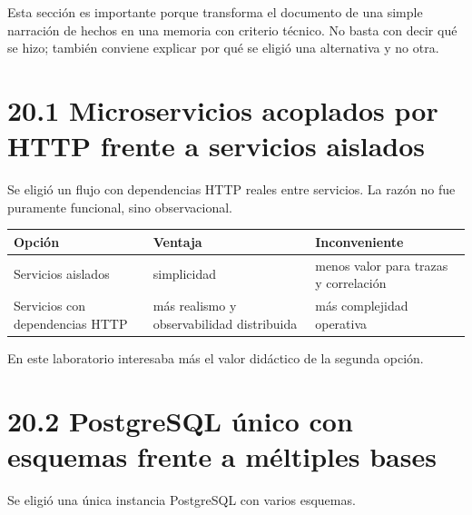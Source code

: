 \documentclass[
a4paper,
12pt]{report}
\begin{document}
Esta sección es importante porque transforma el documento de una simple
narración de hechos en una memoria con criterio técnico. No basta con
decir qué se hizo; también conviene explicar por qué se eligió una
alternativa y no otra.

\section{20.1 Microservicios acoplados por HTTP frente a servicios
aislados}\label{microservicios-acoplados-por-http-frente-a-servicios-aislados}

Se eligió un flujo con dependencias HTTP reales entre servicios. La
razón no fue puramente funcional, sino observacional.

{\def\LTcaptype{table} %
\begin{longtable}[]{@{}
  >{\raggedright\arraybackslash}p{}
  >{\raggedright\arraybackslash}p{}
  >{\raggedright\arraybackslash}p{}@{}}
\toprule\noalign{}
\begin{minipage}[b]{\linewidth}\raggedright
Opción
\end{minipage} & \begin{minipage}[b]{\linewidth}\raggedright
Ventaja
\end{minipage} & \begin{minipage}[b]{\linewidth}\raggedright
Inconveniente
\end{minipage} \\
\midrule\noalign{}
\endhead
\bottomrule\noalign{}
\endlastfoot
Servicios aislados & simplicidad & menos valor para trazas y
correlación \\
Servicios con dependencias HTTP & más realismo y observabilidad
distribuida & más complejidad operativa \\
\end{longtable}
}

En este laboratorio interesaba más el valor didáctico de la segunda
opción.

\section{20.2 PostgreSQL único con esquemas frente a méltiples
bases}\label{postgresql-uxfanico-con-esquemas-frente-a-muxe9ltiples-bases}

Se eligió una única instancia PostgreSQL con varios esquemas.
\end{document}
